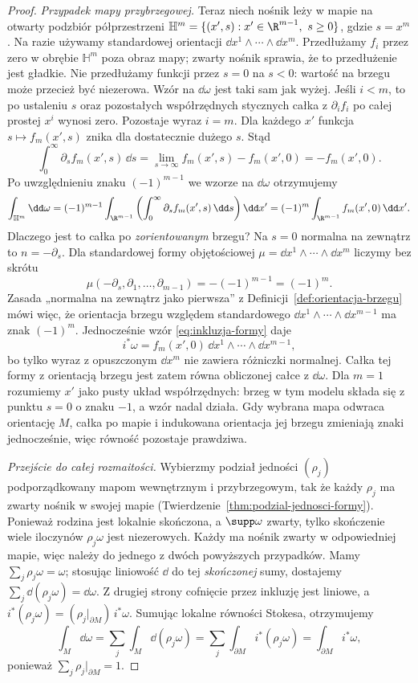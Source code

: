 \begin{proof}
\emph{Przypadek mapy przybrzegowej.}
Teraz niech nośnik leży w mapie na otwarty
podzbiór półprzestrzeni
$\mathbb H^m=\{(x',s):x'\in\R^{m-1},\ s\geq0\}$,
gdzie $s=x^m$. Na razie używamy standardowej
orientacji $\dd x^1\wedge\cdots\wedge\dd x^m$.
Przedłużamy $f_i$ przez zero w obrębie
$\mathbb H^m$ poza obraz mapy; zwarty nośnik
sprawia, że to przedłużenie jest gładkie.
Nie przedłużamy funkcji przez $s=0$ na $s<0$:
wartość na brzegu może przecież być niezerowa.
Wzór na $\dd\omega$ jest taki sam jak wyżej.
Jeśli $i<m$, to po ustaleniu $s$ oraz pozostałych
współrzędnych stycznych całka z $\partial_i f_i$
po całej prostej $x^i$ wynosi zero.
Pozostaje wyraz $i=m$. Dla każdego $x'$ funkcja
$s\mapsto f_m(x',s)$ znika dla dostatecznie
dużego $s$. Stąd
\[
 \int_0^\infty\partial_s f_m(x',s)\,\dd s
 =\lim_{s\to\infty}f_m(x',s)-f_m(x',0)
 =-f_m(x',0).
\]
Po uwzględnieniu znaku $(-1)^{m-1}$ we wzorze
na $\dd\omega$ otrzymujemy
\[
 \int_{\mathbb H^m}\dd\omega
 =(-1)^{m-1}\int_{\R^{m-1}}
  \left(\int_0^\infty\partial_s f_m(x',s)\,\dd s\right)
          \dd x'
 =(-1)^m\int_{\R^{m-1}} f_m(x',0)\,\dd x'.
\]
Dlaczego jest to całka po \emph{zorientowanym}
brzegu? Na $s=0$ normalna na zewnątrz to
$n=-\partial_s$. Dla standardowej formy
objętościowej $\mu=\dd x^1\wedge\cdots\wedge\dd x^m$
liczymy bez skrótu
\[
 \mu(-\partial_s,\partial_1,\ldots,\partial_{m-1})
 =-(-1)^{m-1}=(-1)^m.
\]
Zasada „normalna na zewnątrz jako pierwsza”
z Definicji~\ref{def:orientacja-brzegu} mówi więc,
że orientacja brzegu względem standardowego
$\dd x^1\wedge\cdots\wedge\dd x^{m-1}$
ma znak $(-1)^m$. Jednocześnie wzór
\eqref{eq:inkluzja-formy} daje
\[
 i^*\omega=f_m(x',0)\,
 \dd x^1\wedge\cdots\wedge\dd x^{m-1},
\]
bo tylko wyraz z opuszczonym $\dd x^m$
nie zawiera różniczki normalnej. Całka tej
formy z orientacją brzegu jest zatem równa
obliczonej całce z $\dd\omega$.
Dla $m=1$ rozumiemy $x'$ jako pusty układ
współrzędnych: brzeg w tym modelu składa się
z punktu $s=0$ o znaku $-1$, a wzór nadal działa.
Gdy wybrana mapa odwraca orientację $M$,
całka po mapie i indukowana orientacja jej brzegu
zmieniają znaki jednocześnie, więc równość
pozostaje prawdziwa.

\emph{Przejście do całej rozmaitości.}
Wybierzmy podział jedności $(\rho_j)$
podporządkowany mapom wewnętrznym i przybrzegowym,
tak że każdy $\rho_j$ ma zwarty nośnik w swojej
mapie (Twierdzenie~\ref{thm:podzial-jednosci-formy}).
Ponieważ rodzina jest lokalnie skończona, a
$\supp\omega$ zwarty, tylko skończenie wiele
iloczynów $\rho_j\omega$ jest niezerowych.
Każdy ma nośnik zwarty w odpowiedniej mapie,
więc należy do jednego z dwóch powyższych
przypadków. Mamy $\sum_j\rho_j\omega=\omega$;
stosując liniowość $\dd$ do tej \emph{skończonej}
sumy, dostajemy $\sum_j\dd(\rho_j\omega)=\dd\omega$.
Z drugiej strony cofnięcie przez inkluzję jest
liniowe, a $i^*(\rho_j\omega)
=(\rho_j|_{\partial M})\,i^*\omega$.
Sumując lokalne równości Stokesa, otrzymujemy
\[
 \int_M\dd\omega
 =\sum_j\int_M\dd(\rho_j\omega)
 =\sum_j\int_{\partial M}i^*(\rho_j\omega)
 =\int_{\partial M}i^*\omega,
\]
ponieważ $\sum_j\rho_j|_{\partial M}=1$.
\end{proof}


